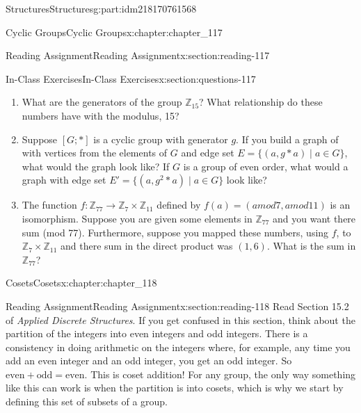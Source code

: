 \documentclass[oneside,10pt,]{book}
\numberwithin{equation}{section}
\begin{document}
\begin{partptx}{Structures}{}{Structures}{}{}{g:part:idm218170761568}
\begin{chapterptx}{Cyclic Groups}{}{Cyclic Groups}{}{}{x:chapter:chapter_117}
\begin{sectionptx}{Reading Assignment}{}{Reading Assignment}{}{}{x:section:reading-117}
%
\end{sectionptx}
%
%
\typeout{************************************************}
\typeout{************************************************}
%
\begin{sectionptx}{In-Class Exercises}{}{In-Class Exercises}{}{}{x:section:questions-117}
%
\begin{enumerate}[label=\arabic*.]
\item{}What are the generators of the group \(\mathbb{Z}_{15}\)?  What relationship do these numbers have with the modulus, 15?%
\item{}Suppose \([G;*]\) is a cyclic group with generator \(g\). If you build a graph of with vertices from the elements of \(G\) and edge set \(E= \{(a, g*a) \mid a\in G\}\), what would the graph look like?  If \(G\) is a group of even order, what would a graph with edge set \(E'= \{(a, g^2*a) \mid a\in G\}\) look like?%
\item{}The function \(f: \mathbb{Z}_{77} \rightarrow \mathbb{Z}_7\times \mathbb{Z}_{11}\) defined by \(f(a)= (a mod 7, a mod 11)\) is an isomorphism.  Suppose you are given some elements in \(\mathbb{Z}_{77}\) and you want there sum (mod 77).  Furthermore, suppose you mapped these numbers, using \(f\), to \(\mathbb{Z}_7\times \mathbb{Z}_{11}\) and there sum in the direct product was \((1,6)\).  What is the sum in \(\mathbb{Z}_{77}\)?%
\end{enumerate}
%
\end{sectionptx}
\end{chapterptx}
%
\typeout{************************************************}
\typeout{************************************************}
%
\begin{chapterptx}{Cosets}{}{Cosets}{}{}{x:chapter:chapter_118}
\index{}%
%
%
\typeout{************************************************}
\typeout{************************************************}
%
\begin{sectionptx}{Reading Assignment}{}{Reading Assignment}{}{}{x:section:reading-118}
Read Section 15.2 of \emph{Applied Discrete Structures}. If you get confused in this section, think about the partition of the integers into even integers and odd integers.  There is a consistency in doing arithmetic on the integers where, for example, any time you add an even integer and an odd integer, you get an odd integer.  So \(\textrm{even} + \textrm{odd} = \textrm{even}\).  This is coset addition!  For any group, the only way something like this can work is when the partition is into cosets, which is why we start by defining this set of subsets of a group.%

\end{sectionptx}
\end{chapterptx}
\end{partptx}
\end{document}
